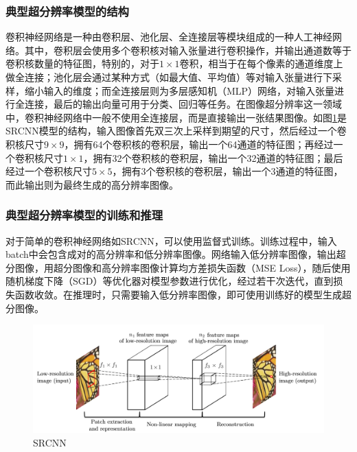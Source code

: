 \subsubsection{典型超分辨率模型的结构}
卷积神经网络是一种由卷积层、池化层、全连接层等模块组成的一种人工神经网络。其中，卷积层会使用多个卷积核对输入张量进行卷积操作，并输出通道数等于卷积核数量的特征图，特别的，对于$1\times 1$卷积，相当于在每个像素的通道维度上做全连接；池化层会通过某种方式（如最大值、平均值）等对输入张量进行下采样，缩小输入的维度；而全连接层则为多层感知机（MLP）网络，对输入张量进行全连接，最后的输出向量可用于分类、回归等任务。在图像超分辨率这一领域中，卷积神经网络中一般不使用全连接层，而是直接输出一张结果图像。如图\ref{fig:SRCNN}是SRCNN模型的结构，输入图像首先双三次上采样到期望的尺寸，然后经过一个卷积核尺寸$9\times 9$，拥有64个卷积核的卷积层，输出一个64通道的特征图；再经过一个卷积核尺寸$1\times 1$，拥有32个卷积核的卷积层，输出一个32通道的特征图；最后经过一个卷积核尺寸$5\times 5$，拥有3个卷积核的卷积层，输出一个3通道的特征图，而此输出则为最终生成的高分辨率图像。
\subsubsection{典型超分辨率模型的训练和推理}
对于简单的卷积神经网络如SRCNN，可以使用监督式训练。训练过程中，输入batch中会包含成对的高分辨率和低分辨率图像。网络输入低分辨率图像，输出超分图像，用超分图像和高分辨率图像计算均方差损失函数（MSE Loss），随后使用随机梯度下降（SGD）等优化器对模型参数进行优化，经过若干次迭代，直到损失函数收敛。在推理时，只需要输入低分辨率图像，即可使用训练好的模型生成超分图像。

\begin{figure}[htbp]
    \centering
    \includegraphics[width=1.0\textwidth]{imgs/SRCNN.png}
    \caption{SRCNN}
    \label{fig:SRCNN}
\end{figure}


